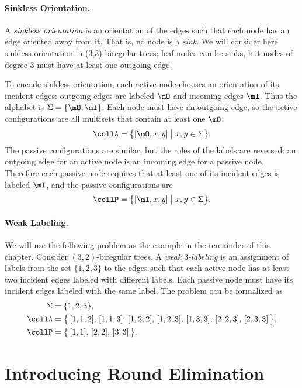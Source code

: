 \paragraph{Sinkless Orientation.} A \emph{sinkless orientation} is an orientation of the edges such that each node has an edge oriented away from it. That is, no node is a \emph{sink}. We will consider here sinkless orientation in (3,3)-biregular trees; leaf nodes can be sinks, but nodes of degree $3$ must have at least one outgoing edge.

To encode sinkless orientation, each active node chooses an orientation of its incident edges: outgoing edges are labeled $\mO$ and incoming edges $\mI$. Thus the alphabet is $\Sigma = \{ \mO, \mI \}$. Each node must have an outgoing edge, so the active configurations are all multisets that contain at least one $\mO$:
\[
	\collA = \bigl\{ [\mO, x, y] \bigm| x, y \in \Sigma \bigr\}.
\]
The passive configurations are similar, but the roles of the labels are reversed: an outgoing edge for an active node is an incoming edge for a passive node. Therefore each passive node requires that at least one of its incident edges is labeled $\mI$, and the passive configurations are
\[
	\collP = \bigl\{ [\mI, x, y] \bigm| x, y \in \Sigma \bigr\}.
\]

\paragraph{Weak Labeling.} We will use the following problem as the example in the remainder of this chapter. Consider $(3,2)$-biregular trees. A \emph{weak $3$-labeling} is an assignment of labels from the set $\{1,2,3\}$ to the edges such that each active node has at least two incident edges labeled with different labels. Each passive node must have its incident edges labeled with the same label. The problem can be formalized as
\begin{align*}
	\Sigma &= \{1,2,3\}, \\
	\collA &= \bigl\{\,
		[ 1, 1, 2 ],\,
		[ 1, 1, 3 ],\,
		[ 1, 2, 2 ],\,
		[ 1, 2, 3 ],\,
		[ 1, 3, 3 ],\,
		[ 2, 2, 3 ],\,
		[ 2, 3, 3 ]
	\,\bigr\}, \\
	\collP &= \bigl\{\,
		[ 1, 1 ],\,
		[ 2, 2 ],\,
		[ 3, 3 ]
	\,\bigr\}. 
\end{align*}

\section{Introducing Round Elimination}

